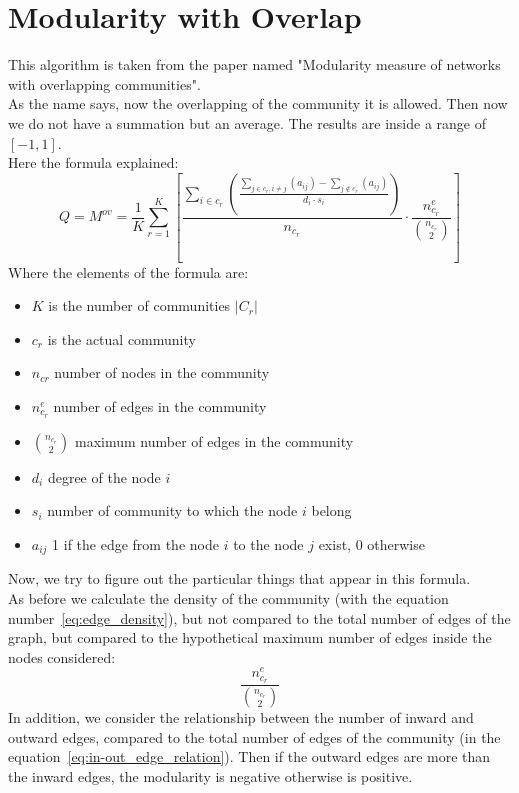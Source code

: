 \section{Modularity with Overlap}
This algorithm is taken from the paper named "Modularity measure of networks with overlapping communities".\\
As the name says, now the overlapping of the community it is allowed. Then now we do not have a summation but an average. The results are inside a range of $[-1, 1]$.\\
Here the formula explained:
\begin{equation}
	Q = M^{ov} = \frac{1}{K} 
	\sum_{r=1}^{K} \left[
		\frac
			{\sum\limits_{i \in c_r} 
				\left( \frac
					{
						\sum\limits_{j \in c_r, i \neq j} \left( a_{ij} \right) 
						- 
						\sum\limits_{j \notin c_r} \left( a_{ij} \right) 
					} 
					{d_i \cdot s_i} 
				\right) } 
			{n_{c_r}}
		\cdot
		\frac{ n^e_{c_r} }{ \binom{n_{c_r}}{2} } 
	\right]
	\label{eq:m_over}
\end{equation}
Where the elements of the formula are:
\begin{itemize}
	\item $K$ is the number of communities $|C_r|$
	\item $c_r$ is the actual community
	\item $n_{cr}$ number of nodes in the community
	\item $n^e_{c_r}$ number of edges in the community
	\item $\binom{n_{c_r}}{2}$ maximum number of edges in the community
	\item $d_i$ degree of the node $i$
	\item $s_i$ number of community to which the node $i$ belong
	\item $a_{ij}$ 1 if the edge from the node $i$ to the node $j$ exist, 0 otherwise
\end{itemize}
Now, we try to figure out the particular things that appear in this formula.\\
As before we calculate the density of the community (with the equation number~\ref{eq:edge_density}), but not compared to the total number of edges of the graph, but compared to the hypothetical maximum number of edges inside the nodes considered:
\begin{equation}
	\frac{ n^e_{c_r} }{ \binom{n_{c_r}}{2} }
	\label{eq:edge_density}
\end{equation}
In addition, we consider the relationship between the number of inward and outward edges, compared to the total number of edges of the community (in the equation~\ref{eq:in-out_edge_relation}). Then if the outward edges are more than the inward edges, the modularity is negative otherwise is positive.\\
